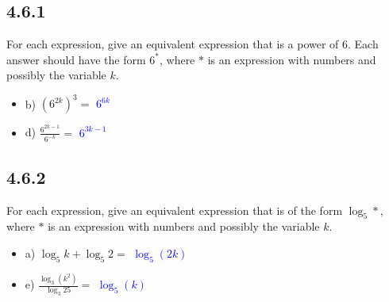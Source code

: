 \documentclass{article}
\begin{document}
\subsection*{4.6.1}
For each expression, give an equivalent expression that is a power of 6. Each answer should have the form $6^*$, where $*$ is an expression with numbers and possibly the variable $k$.
\begin{itemize}
    \item b) $(6^{2k})^3 = $ \textcolor{blue}{$6^{6k}$}
    \item d) $\frac{6^{2k-1}}{6^{-k}} = $ \textcolor{blue}{$6^{3k-1}$}
\end{itemize}

\subsection*{4.6.2}
For each expression, give an equivalent expression that is of the form $\log_{5} *$, where $*$ is an expression with numbers and possibly the variable $k$.
\begin{itemize}
    \item a) $\log_5 k + \log_5 2 = $ \textcolor{blue}{$\log_5(2k)$}
    \item e) $\frac{\log_3(k^2)}{\log_3 25} = $ \textcolor{blue}{$\log_5(k)$}
\end{itemize}
\end{document}
